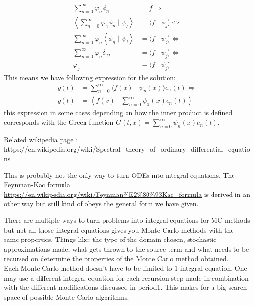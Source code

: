 \documentclass[a4paper,12pt]{article}
\begin{document}
\begin{align*}
    \sum_{n=0}^{\infty} \varphi_n \phi_{n}                                            & = f \Rightarrow                                   \\
    \left \langle \sum_{n=0}^{\infty} \varphi_n \phi_{n}\mid \psi_{j}  \right \rangle & =  \langle f\mid \psi_{j} \rangle \Leftrightarrow \\
    \sum_{n=0}^{\infty} \varphi_n \left \langle \phi_{n}\mid \psi_{j}  \right \rangle & =  \langle f\mid \psi_{j} \rangle \Leftrightarrow \\
    \sum_{n=0}^{\infty} \varphi_n \delta_{nj}                                         & =  \langle f\mid \psi_{j} \rangle \Leftrightarrow \\
    \varphi_j                                                                         & =  \langle f\mid \psi_{j} \rangle
\end{align*}
This means we have following expression for the solution:
\begin{align*}
    y(t) & = \sum_{n=0}^{\infty} \langle f(x)\mid \psi_{n}(x) \rangle e_{n}(t)  \Leftrightarrow \\
    y(t) & = \left\langle f(x)\mid  \sum_{n=0}^{\infty} \psi_{n}(x)e_{n}(t)  \right \rangle
\end{align*}
this expression in some cases depending on how the inner product is defined corresponds
with the Green function $G(t,x) =\sum_{n=0}^{\infty} \psi_{n}(x)e_{n}(t)$.

Related wikipedia page :
\url{https://en.wikipedia.org/wiki/Spectral_theory_of_ordinary_differential_equations}

This is probably not the only way to turn ODEs into integral equations. The Feynman-Kac formula
\url{https://en.wikipedia.org/wiki/Feynman%E2%80%93Kac_formula} 
is derived in an other way but still kind of obeys the general form we have given.

There are multiple ways to turn problems into integral equations for MC methods
but not all those integral equations gives you Monte Carlo methods with the same properties.
Things like: the type of the domain chosen, stochastic approximations made, what gets thrown
to the source term and what needs to be recursed on determine the properties of the Monte
Carlo method obtained.\\

Each Monte Carlo method doesn't have to be limited to $1$ integral equation.
One may use a different integral equation for each recursion step made in combination
with the different modifications discussed in period1. This makes for a big search space
of possible Monte Carlo algorithms. \\
\end{document}
